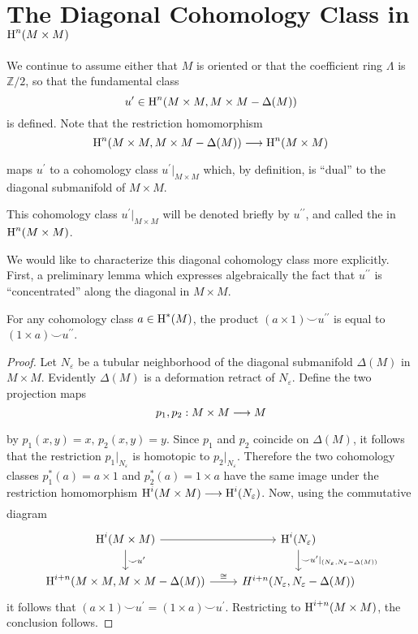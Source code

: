 \documentclass[../main]{subfiles}
\begin{document}
\section{The Diagonal Cohomology Class in \texorpdfstring{$\operatorname{H}^n(M \times M)$}{H n(MxM)}}
We continue to assume either that $M$ is oriented or that the coefficient ring $\Lambda$ is $\mathbb{Z} / 2$, so that the fundamental class
\[u' \in \operatorname{H}^n(M\times M, M\times M - \Delta(M))\]
is defined. Note that the restriction homomorphism
\[\homology^n(M\times M, M\times M - \Delta(M))\varrightarrow{} \homology^n(M\times M)\]
maps $u^{\prime}$ to a cohomology class $u^{\prime} |_{ M \times M}$ which, by definition, is ``dual'' to the diagonal submanifold of $M \times M$. 

\begin{definition} This cohomology class $u^{\prime} |_{ M \times M}$ will be denoted briefly by $u^{\prime \prime}$, and called the  in $\operatorname{H}^{n}(M \times M)$.
\end{definition}

We would like to characterize this diagonal cohomology class more explicitly. First, a preliminary lemma which expresses algebraically the fact that $u^{\prime \prime}$ is ``concentrated'' along the diagonal in $M \times M$.

\begin{lemma}\label{lem:11.08}
For any cohomology class $a \in \operatorname{H}^{*}(M)$, the product $(a \times 1) \smile u^{\prime \prime}$ is equal to $(1 \times a) \smile u^{\prime \prime}$.
\end{lemma} 
\begin{proof} Let $N_{\varepsilon}$ be a tubular neighborhood of the diagonal submanifold $\Delta(M)$ in $M \times M$. Evidently $\Delta(M)$ is a deformation retract of $N_{\varepsilon}$. Define the two projection maps
\[
p_{1}, p_{2}: M \times M \varrightarrow{} M
\]
by $p_{1}(x, y)=x,\, p_{2}(x, y)=y$. Since $p_{1}$ and $p_{2}$ coincide on $\Delta(M)$, it follows that the restriction $p_{1} |_{ N_{\varepsilon}}$ is homotopic to $p_{2} |_{ N_{\varepsilon}}$. Therefore the two cohomology classes $p_{1}^{*}(a)=a \times 1$ and $p_{2}^{*}(a)=1 \times a$ have the same image under the restriction homomorphism $\homology^{i}(M \times M) \varrightarrow{} \homology^{i}(N_{\varepsilon})$. Now, using the commutative diagram
\[\begin{tikzcd}
\homology^i(M\times M) \arrow[r] \arrow[d,"\smile u'"] & \homology^i(N_\varepsilon) \arrow[d,"\smile u'|_{(N_\varepsilon,N_\varepsilon - \Delta(M))}"]\\ \homology^{i+n}(M\times M, M\times M-\Delta(M)) \arrow[r,"\cong"] & H^{i+n} (N_\varepsilon,N_\varepsilon-\Delta(M))
\end{tikzcd}\]
it follows that $(a \times 1) \smile u^{\prime}=(1 \times a) \smile u^{\prime}$. Restricting to $\operatorname{H}^{i+n}(M \times M)$, the conclusion follows.

\end{proof}
\end{document}
